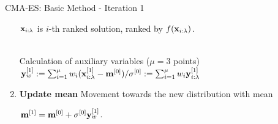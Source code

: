 \documentclass[11pt,compress,t,notes=noshow, xcolor=table]{beamer}
\begin{document}
\begin{vbframe}{CMA-ES: Basic Method - Iteration 1}
\begin{enumerate}
    $\mathbf{x}_{i:\lambda}$ is $i$-th ranked solution, ranked by $f(\mathbf{x}_{i:\lambda})$.

        \vspace{-0.5cm}\\
        Calculation of auxiliary variables ($\mu=3$ points) $\mathbf{y}_w^{[1]} := \sum_{i=1}^{\mu} w_i (\mathbf{x}_{i:\lambda}^{[1]}-\mathbf{m}^{[0]})/\sigma^{[0]} := \sum_{i=1}^{\mu} w_i \mathbf{y}_{i:\lambda}^{[1]}$%


    \item \textbf{Update mean}
        Movement towards the new distribution with mean
        
        $\mathbf{m}^{[1]} = \mathbf{m}^{[0]} + \sigma^{[0]} \mathbf{y}_{w}^{[1]}$.


\end{enumerate}
\end{vbframe}
\end{document}
